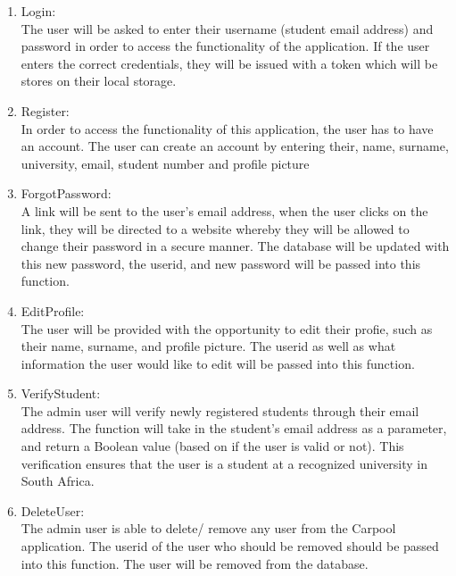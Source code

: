 \documentclass[hidelinks, 12pt, a4paper]{article}
\begin{document}
\begin{enumerate}[label=U1.\arabic*]

      \item Login:\\
            The user will be asked to enter their username (student email address) and password in order to access the functionality of the application. If the user enters the correct credentials, they will be issued with a token which will be stores on their local storage.

      \item Register:\\
            In order to access the functionality of this application, the user has to have an account. The user can create an account by entering their, name, surname, university, email, student number and profile picture

      \item ForgotPassword:\\
            A link will be sent to the user’s email address, when the user clicks on the link, they will be directed to a website whereby they will be allowed to change their password in a secure manner. The database will be updated with this new password, the userid, and new password will be passed into this function.

      \item EditProfile: \\
            The user will be provided with the opportunity to edit their profie, such as their name, surname, and profile picture. The userid as well as what information the user would like to edit will be passed into this function.

      \item VerifyStudent:\\
            The admin user will verify newly registered students through their email address. The function will take in the student’s email address as a parameter, and return a Boolean value (based on if the user is valid or not). This verification ensures that the user is a student at a recognized university in South Africa.

      \item DeleteUser: \\
            The admin user is able to delete/ remove any user from the Carpool application. The userid of the user who should be removed should be passed into this function. The user will be removed from the database.

\end{enumerate}
\end{document}
